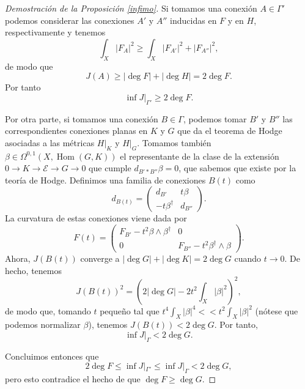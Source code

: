 \documentclass[12pt, a4paper]{amsart}
\newcommand\EE{\mathscr{E}}
\DeclareMathOperator\Hom{Hom}
\theoremstyle{remark} \newtheorem{rmk}[thm]{Observación}
\theoremstyle{remark} \newtheorem{rmks}[thm]{Observaciones}
\theoremstyle{definition} \newtheorem{defn}[thm]{Definición}
\theoremstyle{definition} \newtheorem{ejs}[thm]{Ejemplos}
\theoremstyle{definition} \newtheorem{ej}[thm]{Ejemplo}
\begin{document}
\begin{proof}[Demostración de la Proposición \ref{infimo}]
Si tomamos una conexión $A\in \Gamma'$ podemos considerar las conexiones $A'$ y $A''$ inducidas en $F$ y en $H$, respectivamente y tenemos
\begin{equation*}
	\int_X |F_A|^2 \geq \int_X |F_{A'}|^2 + |F_{A''}|^2,
\end{equation*} 
de modo que 
\begin{equation*}
	J(A)\geq |\deg F| + |\deg H| = 2\deg F.
\end{equation*} 
Por tanto
\begin{equation*}
\inf J|_{\Gamma'} \geq 2\deg F.
\end{equation*} 

Por otra parte, si tomamos una conexión $B\in \Gamma$, podemos tomar $B'$ y $B''$ las correspondientes conexiones planas en $K$ y $G$ que da el teorema de Hodge asociadas a las métricas $H|_K$ y $H|_G$. Tomamos también $\beta \in \Omega^{0,1}(X,\Hom(G,K))$ el representante de la clase de la extensión $0\rightarrow K \rightarrow \EE \rightarrow G \rightarrow 0$ que cumple $d_{B'*B''}\beta =0$, que sabemos que existe por la teoría de Hodge. Definimos una familia de conexiones $B(t)$ como
\begin{equation*}
	d_{B(t)}=
	\begin{pmatrix}
		d_{B'} & t\beta \\
		-t\beta^\dagger & d_{B''}
	\end{pmatrix}.
\end{equation*} 
La curvatura de estas conexiones viene dada por
\begin{equation*}
	F(t)=
	\begin{pmatrix}
		F_{B'}- t^2 \beta \wedge \beta^\dagger & 0 \\
0		 & F_{B''} - t^2\beta^\dagger \wedge \beta
	\end{pmatrix}.
\end{equation*} 
Ahora, $J(B(t))$ converge a $|\deg G|+|\deg K|=2\deg G$ cuando $t\rightarrow 0$. De hecho, tenemos
\begin{equation*}
	J(B(t))^2 = \left(2|\deg G| - 2t^2\int_X|\beta|^2\right)^2,
\end{equation*} 
de modo que, tomando $t$ pequeño tal que $t^4\int_X |\beta|^4 << t^2\int_X |\beta|^2$ (nótese que podemos normalizar $\beta$), tenemos $J(B(t))<2\deg G$. Por tanto, $$\inf J|_{\Gamma}<2\deg G.$$

Concluimos entonces que
\begin{equation*}
	2\deg F \leq \inf J|_{\Gamma'} \leq \inf J|_\Gamma < 2 \deg G,
\end{equation*} 
pero esto contradice el hecho de que $\deg F\geq \deg G$.
\end{proof}
\end{document}
